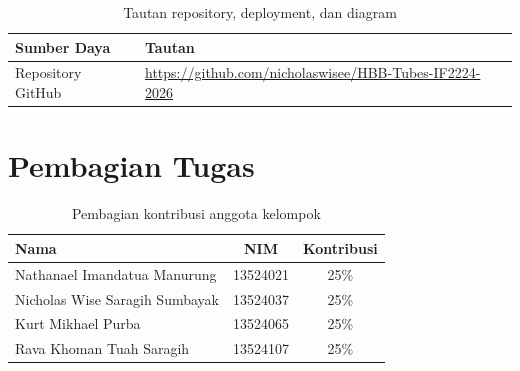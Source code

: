 ﻿\documentclass[12pt,a4paper]{article}
\newcommand{\RepoURL}{https://github.com/nicholaswisee/HBB-Tubes-IF2224-2026}
\begin{document}
\begin{table}[H]
  \centering
  \begin{small}
  \setlength{\tabcolsep}{5pt}
  \begin{tabular}{>{\raggedright\arraybackslash}p{3.1cm}>{\raggedright\arraybackslash}p{11.7cm}}
    \toprule
    \textbf{Sumber Daya} & \textbf{Tautan} \\
    \midrule
    Repository GitHub & \url{\RepoURL} \\
    \bottomrule
  \end{tabular}
  \end{small}
  \caption{Tautan repository, deployment, dan diagram}
\end{table}

\section*{Pembagian Tugas}

\begin{table}[H]
  \centering
  \begin{tabular}{>{\raggedright\arraybackslash}p{7.6cm}cc}
    \toprule
    \textbf{Nama} & \textbf{NIM} & \textbf{Kontribusi} \\
    \midrule
    Nathanael Imandatua Manurung & 13524021 & 25\% \\
    Nicholas Wise Saragih Sumbayak & 13524037 & 25\% \\
    Kurt Mikhael Purba & 13524065 & 25\% \\
    Rava Khoman Tuah Saragih & 13524107 & 25\% \\
    \bottomrule
  \end{tabular}
  \caption{Pembagian kontribusi anggota kelompok}
\end{table}
\end{document}
